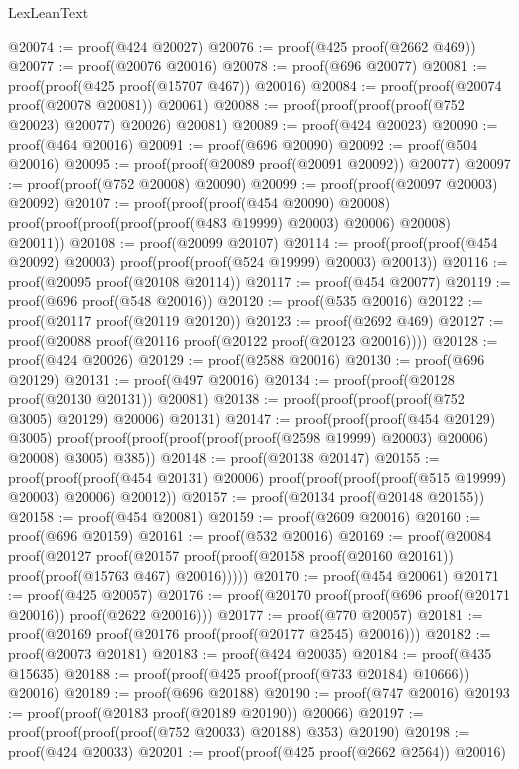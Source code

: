 \begin{lexlean}{LexLeanText}
\begin{coremodule}
@20074 := proof(@424 @20027)
@20076 := proof(@425 proof(@2662 @469))
@20077 := proof(@20076 @20016)
@20078 := proof(@696 @20077)
@20081 := proof(proof(@425 proof(@15707 @467)) @20016)
@20084 := proof(proof(@20074 proof(@20078 @20081)) @20061)
@20088 := proof(proof(proof(proof(@752 @20023) @20077) @20026) @20081)
@20089 := proof(@424 @20023)
@20090 := proof(@464 @20016)
@20091 := proof(@696 @20090)
@20092 := proof(@504 @20016)
@20095 := proof(proof(@20089 proof(@20091 @20092)) @20077)
@20097 := proof(proof(@752 @20008) @20090)
@20099 := proof(proof(@20097 @20003) @20092)
@20107 := proof(proof(proof(@454 @20090) @20008)
      proof(proof(proof(proof(proof(@483 @19999) @20003) @20006) @20008) @20011))
@20108 := proof(@20099 @20107)
@20114 := proof(proof(proof(@454 @20092) @20003) proof(proof(proof(@524 @19999) @20003) @20013))
@20116 := proof(@20095 proof(@20108 @20114))
@20117 := proof(@454 @20077)
@20119 := proof(@696 proof(@548 @20016))
@20120 := proof(@535 @20016)
@20122 := proof(@20117 proof(@20119 @20120))
@20123 := proof(@2692 @469)
@20127 := proof(@20088 proof(@20116 proof(@20122 proof(@20123 @20016))))
@20128 := proof(@424 @20026)
@20129 := proof(@2588 @20016)
@20130 := proof(@696 @20129)
@20131 := proof(@497 @20016)
@20134 := proof(proof(@20128 proof(@20130 @20131)) @20081)
@20138 := proof(proof(proof(proof(@752 @3005) @20129) @20006) @20131)
@20147 := proof(proof(proof(@454 @20129) @3005)
      proof(proof(proof(proof(proof(proof(@2598 @19999) @20003) @20006) @20008) @3005) @385))
@20148 := proof(@20138 @20147)
@20155 := proof(proof(proof(@454 @20131) @20006)
      proof(proof(proof(proof(@515 @19999) @20003) @20006) @20012))
@20157 := proof(@20134 proof(@20148 @20155))
@20158 := proof(@454 @20081)
@20159 := proof(@2609 @20016)
@20160 := proof(@696 @20159)
@20161 := proof(@532 @20016)
@20169 := proof(@20084
      proof(@20127
          proof(@20157 proof(proof(@20158 proof(@20160 @20161)) proof(proof(@15763 @467) @20016)))))
@20170 := proof(@454 @20061)
@20171 := proof(@425 @20057)
@20176 := proof(@20170 proof(proof(@696 proof(@20171 @20016)) proof(@2622 @20016)))
@20177 := proof(@770 @20057)
@20181 := proof(@20169 proof(@20176 proof(proof(@20177 @2545) @20016)))
@20182 := proof(@20073 @20181)
@20183 := proof(@424 @20035)
@20184 := proof(@435 @15635)
@20188 := proof(proof(@425 proof(proof(@733 @20184) @10666)) @20016)
@20189 := proof(@696 @20188)
@20190 := proof(@747 @20016)
@20193 := proof(proof(@20183 proof(@20189 @20190)) @20066)
@20197 := proof(proof(proof(proof(@752 @20033) @20188) @353) @20190)
@20198 := proof(@424 @20033)
@20201 := proof(proof(@425 proof(@2662 @2564)) @20016)

\end{coremodule}
\end{lexlean}
